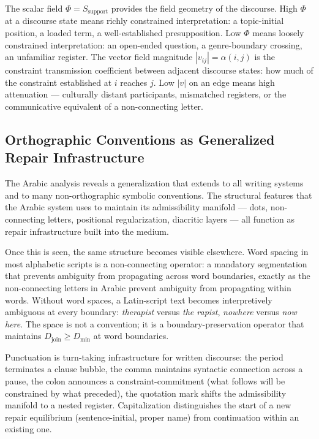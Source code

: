 \documentclass[11pt, a4paper]{article}
\theoremstyle{definition}
\theoremstyle{remark}
\begin{document}
The scalar field $\Phi = S_{\mathrm{support}}$ provides the field geometry of
the discourse. High $\Phi$ at a discourse state means richly constrained
interpretation: a topic-initial position, a loaded term, a well-established
presupposition. Low $\Phi$ means loosely constrained interpretation: an
open-ended question, a genre-boundary crossing, an unfamiliar register.
The vector field magnitude $|v_{ij}| = \alpha(i,j)$ is the constraint
transmission coefficient between adjacent discourse states: how much of the
constraint established at $i$ reaches $j$. Low $|v|$ on an edge means
high attenuation --- culturally distant participants, mismatched registers,
or the communicative equivalent of a non-connecting letter.

\subsection{Orthographic Conventions as Generalized Repair Infrastructure}

The Arabic analysis reveals a generalization that extends to all writing
systems and to many non-orthographic symbolic conventions. The structural
features that the Arabic system uses to maintain its admissibility manifold
--- dots, non-connecting letters, positional regularization, diacritic
layers --- all function as repair infrastructure built into the medium.

Once this is seen, the same structure becomes visible elsewhere. Word spacing
in most alphabetic scripts is a non-connecting operator: a mandatory
segmentation that prevents ambiguity from propagating across word boundaries,
exactly as the non-connecting letters in Arabic prevent ambiguity from
propagating within words. Without word spaces, a Latin-script text becomes
interpretively ambiguous at every boundary: \textit{therapist} versus
\textit{the rapist}, \textit{nowhere} versus \textit{now here}. The space is
not a convention; it is a boundary-preservation operator that maintains
$D_{\mathrm{join}} \geq D_{\min}$ at word boundaries.

Punctuation is turn-taking infrastructure for written discourse: the period
terminates a clause bubble, the comma maintains syntactic connection across
a pause, the colon announces a constraint-commitment (what follows will be
constrained by what preceded), the quotation mark shifts the admissibility
manifold to a nested register. Capitalization distinguishes the start of a
new repair equilibrium (sentence-initial, proper name) from continuation
within an existing one.
\end{document}
